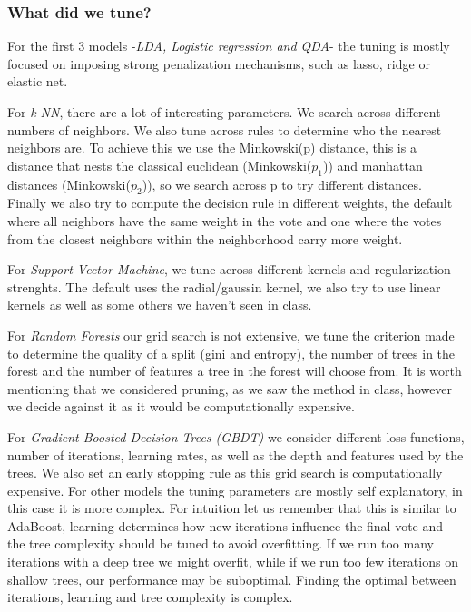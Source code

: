 \documentclass{article}
\begin{document}
\subsubsection{What did we tune?}

For the first 3 models -\textit{LDA, Logistic regression and QDA}- the tuning is mostly focused on imposing strong penalization mechanisms, such as lasso, ridge or elastic net.

For \textit{k-NN}, there are a lot of interesting parameters. We search across different numbers of neighbors. We also tune across rules to determine who the nearest
neighbors are. To achieve this we use the Minkowski(p) distance, this is a distance that nests the classical euclidean (Minkowski($p_1$)) and manhattan distances (Minkowski($p_2$)), so we search across p to try different distances.
Finally we also try to compute the decision rule in different weights, the default where all neighbors have the same weight in the vote and one where the votes from the closest neighbors within the neighborhood carry more weight.

For \textit{Support Vector Machine}, we tune across different kernels and regularization strenghts. The default uses the radial/gaussin kernel, we also try to use linear kernels as well as some others we haven't seen in class.

For \textit{Random Forests} our grid search is not extensive, we tune the criterion made to determine the quality of a split (gini and entropy), the number of trees in the forest and the number of features a tree in the forest will choose from.
It is worth mentioning that we considered pruning, as we saw the method in class, however we decide against it as it would be computationally expensive.

For \textit{Gradient Boosted Decision Trees (GBDT)} we consider different loss functions, number of iterations, learning rates, as well as the depth and features used by the trees. 
We also set an early stopping rule as this grid search is computationally expensive.
For other models the tuning parameters are mostly self explanatory, in this case it is more complex.
For intuition let us remember that this is similar to AdaBoost, learning determines how new iterations influence the final vote and the tree complexity should be tuned to avoid overfitting.
If we run too many iterations with a deep tree we might overfit, while if we run too few iterations on shallow trees, our performance may be suboptimal.
Finding the optimal between iterations, learning and tree complexity is complex.
\end{document}
